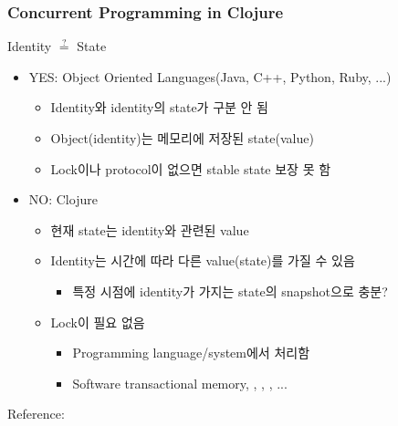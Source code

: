 \begin{frame}[fragile]
\frametitle{Concurrent Programming in Clojure}

\begin{center}
Identity $\stackrel{?}{=}$ State
\end{center}

\begin{itemize}
\item YES: Object Oriented Languages(Java, C++, Python, Ruby, ...)
  \begin{itemize}
  \item Identity와 identity의 state가 구분 안 됨
  \item Object(identity)는 메모리에 저장된 state(value)
  \item Lock이나 protocol이 없으면 stable state 보장 못 함
  \end{itemize}
\item NO: Clojure
  \begin{itemize}
  \item 현재 state는 identity와 관련된 value
  \item Identity는 시간에 따라 다른 value(state)를 가질 수 있음
    \begin{itemize}
    \item 특정 시점에 identity가 가지는 state의 snapshot으로 충분?
    \end{itemize}
  \item Lock이 필요 없음
    \begin{itemize}
    \item Programming language/system에서 처리함
    \item Software transactional memory, , , , ...
    \end{itemize}
  \end{itemize}
\end{itemize}

\vfill

\mbox{\tiny Reference: }

\end{frame}


